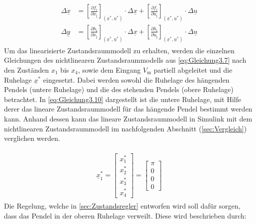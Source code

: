 \begin{align} \label{eq:Gleichung3.9}
    \begin{split}
        \Delta\dot{\underline{x}} &= \left[\frac{\partial f_{\mathrm{i}}}{\partial x_{\mathrm{j}}}\right]_{(\underline{x}^{*}, \underline{u}^{*})}\cdot\Delta{\underline{x}}+\left[\frac{\partial f_{\mathrm{i}}}{\partial u_{\mathrm{j}}}\right]_{(\underline{x}^{*},\underline{u}^{*})}\cdot\Delta{\underline{u}} \\   
        \Delta{\underline{y}} &= \left[\frac{\partial h_{\mathrm{i}}}{\partial x_{\mathrm{j}}}\right]_{(\underline{x}^{*}, \underline{u}^{*})}\cdot\Delta{\underline{x}}+\left[\frac{\partial h_{\mathrm{i}}}{\partial u_{\mathrm{j}}}\right]_{(\underline{x}^{*},\underline{u}^{*})}\cdot\Delta{\underline{u}}
    \end{split}
\end{align}
\newline
Um das linearisierte Zustandsraummodell zu erhalten, werden die einzelnen Gleichungen des nichtlinearen Zustandsraummodells aus \autoref{eq:Gleichung3.7} nach den Zuständen $x_{\mathrm{1}}$ bis $x_{\mathrm{4}}$, sowie dem Eingang $V_{\mathrm{m}}$ partiell abgeleitet und die Ruhelage $\underline{x}^{*}$ eingesetzt. Dabei werden sowohl die Ruhelage des hängenden Pendels (untere Ruhelage) und die des stehenden Pendels (obere Ruhelage) betrachtet. In \autoref{eq:Gleichung3.10} dargestellt ist die untere Ruhelage, mit Hilfe derer das lineare Zustandsraummodell für das hängende Pendel bestimmt werden kann. Anhand dessen kann das lineare Zustandsraummodell in Simulink mit dem nichtlinearen Zustandsraummodell im nachfolgenden Abschnitt (\autoref{sec:Vergleich}) verglichen werden.

\begin{align}\label{eq:Gleichung3.10}
    \begin{split}
        \underline{x}_{\mathrm{1}}^{*}=
        \begin{bmatrix}
            x_{\mathrm{1}}^{*} \\
            x_{\mathrm{2}}^{*} \\
            x_{\mathrm{3}}^{*} \\
            x_{\mathrm{4}}^{*}
        \end{bmatrix}=
        \begin{bmatrix}
            \pi \\
            0   \\
            0   \\
            0
        \end{bmatrix}
    \end{split}
\end{align}
\newline
Die Regelung, welche in \autoref{sec:Zustandsregler} entworfen wird soll dafür sorgen, dass das Pendel in der oberen Ruhelage verweilt. Diese wird beschrieben durch:

